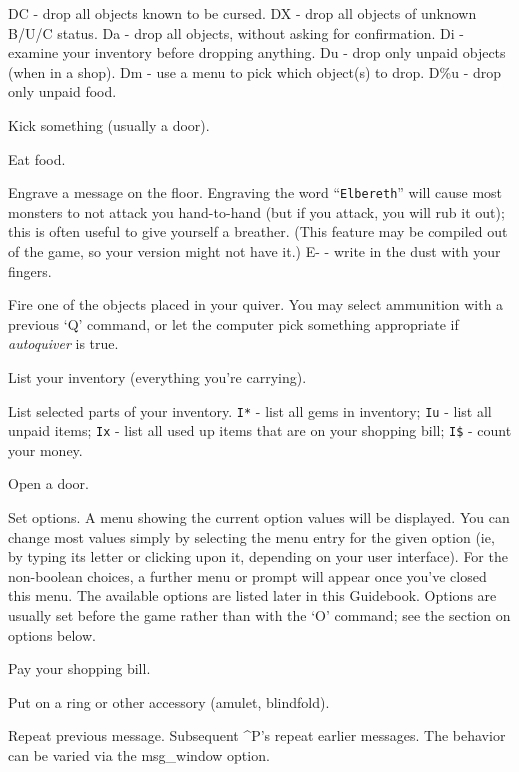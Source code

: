 DC  - drop all objects known to be cursed.
DX  - drop all objects of unknown B/U/C status.
Da  - drop all objects, without asking for confirmation.
Di  - examine your inventory before dropping anything.
Du  - drop only unpaid objects (when in a shop).
Dm  - use a menu to pick which object(s) to drop.
D\%u - drop only unpaid food.
\item[\tb{\^D}]
Kick something (usually a door).
\item[\tb{e}]
Eat food.
\item[\tb{E}]
Engrave a message on the floor.
Engraving the word ``{\tt Elbereth}'' will cause most monsters to not attack
you hand-to-hand (but if you attack, you will rub it out); this is
often useful to give yourself a breather.  (This feature may be compiled out
of the game, so your version might not have it.)
E- - write in the dust with your fingers.  
\item[\tb{f}]
Fire one of the objects placed in your quiver.  You may select
ammunition with a previous `Q' command, or let the computer pick
something appropriate if
{\it autoquiver }
is true.
\item[\tb{i}]
List your inventory (everything you're carrying).
\item[\tb{I}]
List selected parts of your inventory.
{\tt I*} - list all gems in inventory;
{\tt Iu} - list all unpaid items;
{\tt Ix} - list all used up items that are on your shopping bill;
{\tt I\$} - count your money.
\item[\tb{o}]
Open a door.
\item[\tb{O}]
Set options.  A menu showing the current option values will be
displayed.  You can change most values simply by selecting the menu
entry for the given option (ie, by typing its letter or clicking upon
it, depending on your user interface).  For the non-boolean choices,
a further menu or prompt will appear once you've closed this menu.
The available options
are listed later in this Guidebook.  Options are usually set before the
game rather than with the `O' command; see the section on options below.
\item[\tb{p}]
Pay your shopping bill.
\item[\tb{P}]
Put on a ring or other accessory (amulet, blindfold).
\item[\tb{\^P}]
Repeat previous message.  Subsequent \^{}P's repeat earlier messages.
The behavior can be varied via the msg\_window option.
